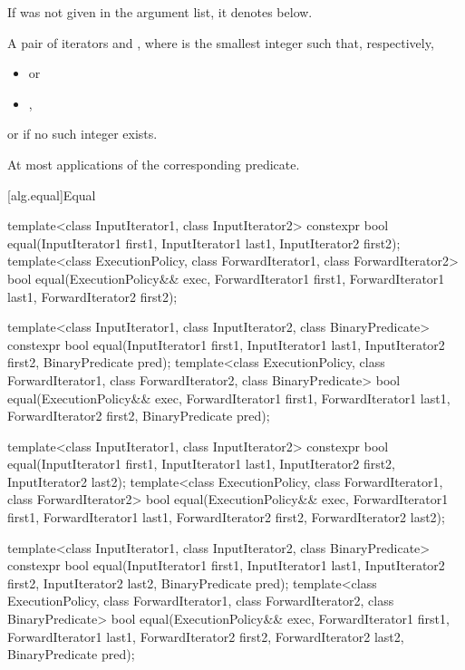 \begin{itemdescr}
\pnum
\remarks If  was not given in the argument list, it denotes
 below.

\pnum
\returns
A pair of iterators  and
, where  is the smallest integer
such that, respectively,
\begin{itemize}
\item {} or
\item {},
\end{itemize}
or  if no such integer exists.

\pnum
\complexity
At most
applications of the corresponding predicate.
\end{itemdescr}

[alg.equal]{Equal}

%
\begin{itemdecl}
template<class InputIterator1, class InputIterator2>
  constexpr bool equal(InputIterator1 first1, InputIterator1 last1,
                       InputIterator2 first2);
template<class ExecutionPolicy, class ForwardIterator1, class ForwardIterator2>
  bool equal(ExecutionPolicy&& exec,
             ForwardIterator1 first1, ForwardIterator1 last1,
             ForwardIterator2 first2);

template<class InputIterator1, class InputIterator2,
         class BinaryPredicate>
  constexpr bool equal(InputIterator1 first1, InputIterator1 last1,
                       InputIterator2 first2, BinaryPredicate pred);
template<class ExecutionPolicy, class ForwardIterator1, class ForwardIterator2,
         class BinaryPredicate>
  bool equal(ExecutionPolicy&& exec,
             ForwardIterator1 first1, ForwardIterator1 last1,
             ForwardIterator2 first2, BinaryPredicate pred);

template<class InputIterator1, class InputIterator2>
  constexpr bool equal(InputIterator1 first1, InputIterator1 last1,
                       InputIterator2 first2, InputIterator2 last2);
template<class ExecutionPolicy, class ForwardIterator1, class ForwardIterator2>
  bool equal(ExecutionPolicy&& exec,
             ForwardIterator1 first1, ForwardIterator1 last1,
             ForwardIterator2 first2, ForwardIterator2 last2);

template<class InputIterator1, class InputIterator2,
         class BinaryPredicate>
  constexpr bool equal(InputIterator1 first1, InputIterator1 last1,
                       InputIterator2 first2, InputIterator2 last2,
                       BinaryPredicate pred);
template<class ExecutionPolicy, class ForwardIterator1, class ForwardIterator2,
         class BinaryPredicate>
  bool equal(ExecutionPolicy&& exec,
             ForwardIterator1 first1, ForwardIterator1 last1,
             ForwardIterator2 first2, ForwardIterator2 last2,
             BinaryPredicate pred);
\end{itemdecl}

